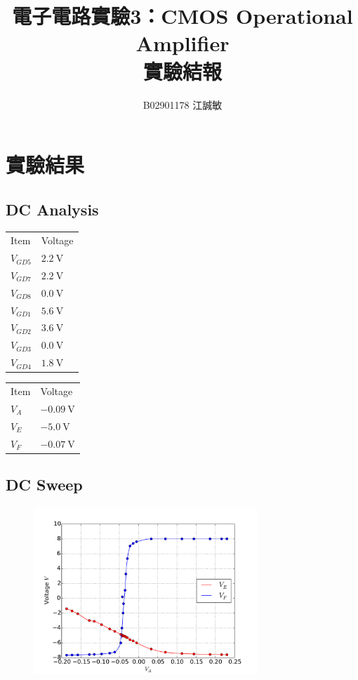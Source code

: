 \documentclass[12pt, a4paper]{article}
\title{ \bf {\Huge 電子電路實驗3：CMOS Operational Amplifier}\\ 實驗結報}
\author{B02901178 江誠敏}
\begin{document}
\maketitle


\section{實驗結果}
\subsection{DC Analysis}

\begin{minipage}[t]{0.5\textwidth}
\begin{tabular}{p{3cm}p{3cm}}
	\hline
  Item & Voltage\\
	\hhline{==}
  $V_{GD5}$ & $\SI{2.2}\V$ \\
  $V_{GD7}$ & $\SI{2.2}\V$ \\
  $V_{GD8}$ & $\SI{0.0}\V$ \\
  $V_{GD1}$ & $\SI{5.6}\V$ \\
  $V_{GD2}$ & $\SI{3.6}\V$ \\
  $V_{GD3}$ & $\SI{0.0}\V$ \\
  $V_{GD4}$ & $\SI{1.8}\V$ \\
	\hline
\end{tabular}
\end{minipage}%
\begin{minipage}[t]{0.5\textwidth}
\begin{tabular}{p{3cm}p{3cm}}
	\hline
  Item & Voltage\\
	\hhline{==}
  $V_{A}$ & $\SI{-0.09}\V$ \\
  $V_{E}$ & $\SI{-5.0}\V$ \\
  $V_{F}$ & $\SI{-0.07}\V$ \\
	\hline
\end{tabular}
\end{minipage}
\subsection{DC Sweep}
\vspace*{-0.5cm}
\begin{figure}[H]
\begin{center}
  \includegraphics[width=0.75\textwidth]{fig1.pdf}
\end{center}
\label{fig:}
\end{figure}
\end{document}
